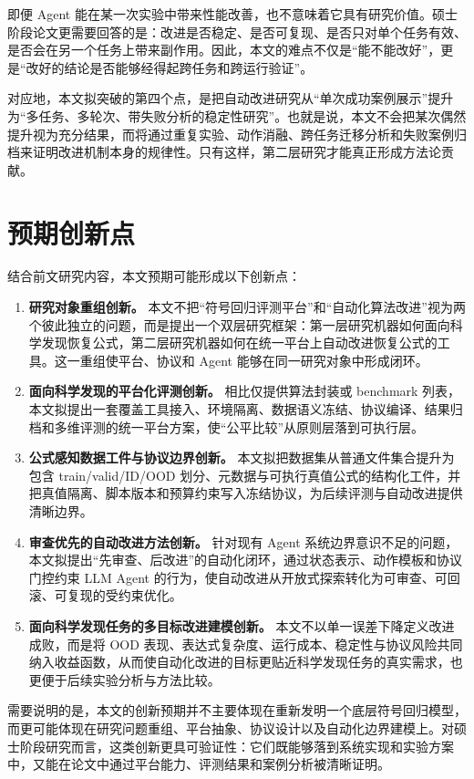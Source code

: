 \documentclass[UTF8,12pt]{ctexart}
\begin{document}
即便 Agent 能在某一次实验中带来性能改善，也不意味着它具有研究价值。硕士阶段论文更需要回答的是：改进是否稳定、是否可复现、是否只对单个任务有效、是否会在另一个任务上带来副作用。因此，本文的难点不仅是“能不能改好”，更是“改好的结论是否能够经得起跨任务和跨运行验证”。

对应地，本文拟突破的第四个点，是把自动改进研究从“单次成功案例展示”提升为“多任务、多轮次、带失败分析的稳定性研究”。也就是说，本文不会把某次偶然提升视为充分结果，而将通过重复实验、动作消融、跨任务迁移分析和失败案例归档来证明改进机制本身的规律性。只有这样，第二层研究才能真正形成方法论贡献。

\section{预期创新点}

结合前文研究内容，本文预期可能形成以下创新点：
\begin{enumerate}
    \item \textbf{研究对象重组创新。} 本文不把“符号回归评测平台”和“自动化算法改进”视为两个彼此独立的问题，而是提出一个双层研究框架：第一层研究机器如何面向科学发现恢复公式，第二层研究机器如何在统一平台上自动改进恢复公式的工具。这一重组使平台、协议和 Agent 能够在同一研究对象中形成闭环。
    \item \textbf{面向科学发现的平台化评测创新。} 相比仅提供算法封装或 benchmark 列表，本文拟提出一套覆盖工具接入、环境隔离、数据语义冻结、协议编译、结果归档和多维评测的统一平台方案，使“公平比较”从原则层落到可执行层。
    \item \textbf{公式感知数据工件与协议边界创新。} 本文拟把数据集从普通文件集合提升为包含 train/valid/ID/OOD 划分、元数据与可执行真值公式的结构化工件，并把真值隔离、脚本版本和预算约束写入冻结协议，为后续评测与自动改进提供清晰边界。
    \item \textbf{审查优先的自动改进方法创新。} 针对现有 Agent 系统边界意识不足的问题，本文拟提出“先审查、后改进”的自动化闭环，通过状态表示、动作模板和协议门控约束 LLM Agent 的行为，使自动改进从开放式探索转化为可审查、可回滚、可复现的受约束优化。
    \item \textbf{面向科学发现任务的多目标改进建模创新。} 本文不以单一误差下降定义改进成败，而是将 OOD 表现、表达式复杂度、运行成本、稳定性与协议风险共同纳入收益函数，从而使自动化改进的目标更贴近科学发现任务的真实需求，也更便于后续实验分析与方法比较。
\end{enumerate}

需要说明的是，本文的创新预期并不主要体现在重新发明一个底层符号回归模型，而更可能体现在研究问题重组、平台抽象、协议设计以及自动化边界建模上。对硕士阶段研究而言，这类创新更具可验证性：它们既能够落到系统实现和实验方案中，又能在论文中通过平台能力、评测结果和案例分析被清晰证明。
\end{document}
